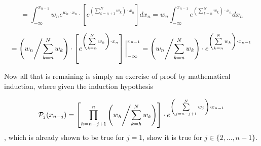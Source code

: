\documentclass[fleqn]{article}
\begin{document}
$$
 = \int_{-\infty}^{x_{n - 1}} w_n \left. e^{w_n \cdot x_n} \right.\cdot \left[ e^{\left(\sum\limits_{k = n + 1}^N w_k\right) \cdot x_n} \right]d x_n
 = w_n\int_{-\infty}^{x_{n - 1}}e^{\left(\sum\limits_{k = n}^N w_k\right) \cdot x_n} d x_n
$$

\bigskip

$$
 = \left( w_n \middle/ {\sum\limits_{k = n}^N w_k}\right) \cdot \left [ e^{\left(\sum\limits_{k = n}^N w_k\right) \cdot x_n} \right ]\bigg\rvert_{-\infty}^{x_{n - 1}}
 = \left( w_n \middle/{\sum\limits_{k = n}^N w_k} \right ) \cdot e^{\left(\sum\limits_{k = n}^N w_k\right) \cdot x_{n - 1}}
$$

Now all that is remaining is simply an exercise of proof by mathematical induction, where given the induction hypothesis

$$
\mathcal{P}_j(x_{n - j}) = \left[ \prod\limits_{h = n - j + 1}^{n} \left( w_h \middle/ {\sum\limits_{k = h}^N w_k} \right) \right] \cdot e^{\left(\sum\limits_{j = n - j + 1}^N w_j\right) \cdot x_{n - 1}}
$$
, which is already shown to be true for $j = 1$, show it is true for $j \in \{2, \dots, n - 1\}$.
\end{document}
